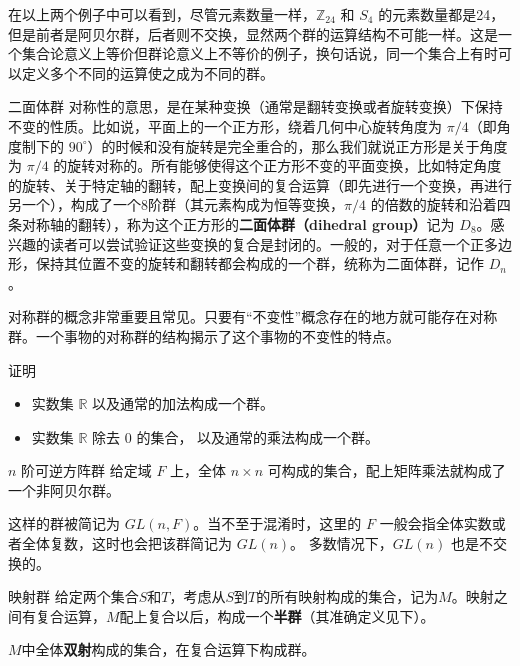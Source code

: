 在以上两个例子中可以看到，尽管元素数量一样，$\mathbb{Z}_{24}$ 和 $S_4$ 的元素数量都是24，但是前者是阿贝尔群，后者则不交换，显然两个群的运算结构不可能一样。这是一个集合论意义上等价但群论意义上不等价的例子，换句话说，同一个集合上有时可以定义多个不同的运算使之成为不同的群。

\begin{example}{二面体群}\label{ex_Group_4}
对称性的意思，是在某种变换（通常是翻转变换或者旋转变换）下保持不变的性质。比如说，平面上的一个正方形，绕着几何中心旋转角度为 $\pi/4$（即角度制下的 $90^\circ$）的时候和没有旋转是完全重合的，那么我们就说正方形是关于角度为 $\pi/4$ 的旋转对称的。所有能够使得这个正方形不变的平面变换，比如特定角度的旋转、关于特定轴的翻转，配上变换间的复合运算（即先进行一个变换，再进行另一个），构成了一个8阶群（其元素构成为恒等变换，$\pi/4$ 的倍数的旋转和沿着四条对称轴的翻转），称为这个正方形的\textbf{二面体群（dihedral group）}记为 $D_8$。感兴趣的读者可以尝试验证这些变换的复合是封闭的。一般的，对于任意一个正多边形，保持其位置不变的旋转和翻转都会构成的一个群，统称为二面体群，记作 $D_n$。
\end{example}
对称群的概念非常重要且常见。只要有“不变性”概念存在的地方就可能存在对称群。一个事物的对称群的结构揭示了这个事物的不变性的特点。

\begin{exercise}{}
证明
\begin{itemize}
\item 实数集 $\mathbb R$ 以及通常的加法构成一个群。
\item 实数集 $\mathbb R$ 除去 $0$ 的集合， 以及通常的乘法构成一个群。
\end{itemize}
\end{exercise}

\begin{example}{$n$ 阶可逆方阵群}\label{ex_Group_5}
给定域 $F$ 上，全体 $n\times n$ 可构成的集合，配上矩阵乘法就构成了一个非阿贝尔群。%

这样的群被简记为 $GL(n, F)$。当不至于混淆时，这里的 $F$ 一般会指全体实数或者全体复数，这时也会把该群简记为 $GL(n)$。 多数情况下，$GL(n)$ 也是不交换的。
\end{example}


\begin{example}{映射群}\label{ex_Group_6}
给定两个集合$S$和$T$，考虑从$S$到$T$的所有映射构成的集合，记为$M$。映射之间有复合运算，$M$配上复合以后，构成一个\textbf{半群}（其准确定义见下）。

$M$中全体\textbf{双射}构成的集合，在复合运算下构成群。
\end{example}

